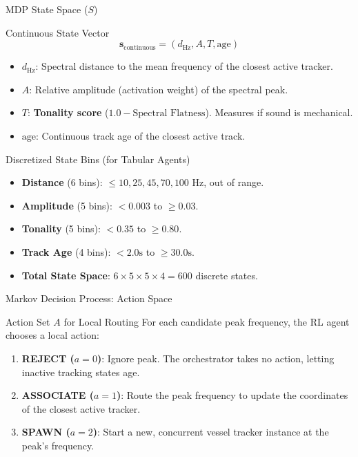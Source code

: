 \documentclass[10pt]{beamer}
\begin{document}
\begin{frame}{MDP State Space ($S$)}
    \begin{block}{Continuous State Vector}
        $$\mathbf{s}_{\text{continuous}} = (d_{\text{Hz}}, A, T, \text{age})$$
        \begin{itemize}
            \item $d_{\text{Hz}}$: Spectral distance to the mean frequency of the closest active tracker.
            \item $A$: Relative amplitude (activation weight) of the spectral peak.
            \item $T$: \textbf{Tonality score} ($1.0 - \text{Spectral Flatness}$). Measures if sound is mechanical.
            \item $\text{age}$: Continuous track age of the closest active track.
        \end{itemize}
    \end{block}

    \begin{block}{Discretized State Bins (for Tabular Agents)}
        \begin{itemize}
            \item \textbf{Distance} (6 bins): $\le 10, 25, 45, 70, 100\text{ Hz}$, out of range.
            \item \textbf{Amplitude} (5 bins): $<0.003$ to $\ge 0.03$.
            \item \textbf{Tonality} (5 bins): $<0.35$ to $\ge 0.80$.
            \item \textbf{Track Age} (4 bins): $<2.0\text{s}$ to $\ge 30.0\text{s}$.
            \item \textbf{Total State Space}: $6 \times 5 \times 5 \times 4 = 600$ discrete states.
        \end{itemize}
    \end{block}
\end{frame}

\begin{frame}{Markov Decision Process: Action Space}
    \begin{block}{Action Set $A$ for Local Routing}
        For each candidate peak frequency, the RL agent chooses a local action:
        \begin{enumerate}
            \item \textbf{REJECT ($a = 0$)}: Ignore peak. The orchestrator takes no action, letting inactive tracking states age.
            \item \textbf{ASSOCIATE ($a = 1$)}: Route the peak frequency to update the coordinates of the closest active tracker.
            \item \textbf{SPAWN ($a = 2$)}: Start a new, concurrent vessel tracker instance at the peak's frequency.
        \end{enumerate}
    \end{block}
\end{frame}
\end{document}
